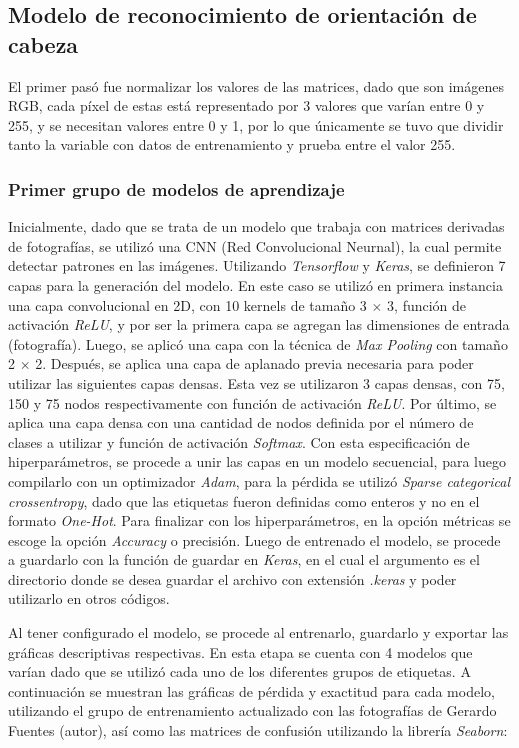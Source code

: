 \subsection{Modelo de reconocimiento de orientación de cabeza}
El primer pasó fue normalizar los valores de las matrices, dado que son imágenes RGB, cada píxel de estas está representado por 3 valores que varían entre 0 y 255, y se necesitan valores entre 0 y 1, por lo que únicamente se tuvo que dividir tanto la variable con datos de entrenamiento y prueba entre el valor 255. 

\subsubsection{Primer grupo de modelos de aprendizaje}
Inicialmente, dado que se trata de un modelo que trabaja con matrices derivadas de fotografías, se utilizó una CNN (Red Convolucional Neurnal), la cual permite detectar patrones en las imágenes. Utilizando \textit{Tensorflow} y \textit{Keras}, se definieron 7 capas para la generación del modelo. En este caso se utilizó en primera instancia una capa convolucional en 2D, con 10 kernels de tamaño 3 $\times$ 3, función de activación \textit{ReLU}, y por ser la primera capa se agregan las dimensiones de entrada (fotografía). Luego, se aplicó una capa con la técnica de \textit{Max Pooling} con tamaño 2 $\times$ 2. Después, se aplica una capa de aplanado previa necesaria para poder utilizar las siguientes capas densas. Esta vez se utilizaron 3 capas densas, con 75, 150 y 75 nodos respectivamente con función de activación \textit{ReLU}. Por último, se aplica una capa densa con una cantidad de nodos definida por el número de clases a utilizar y función de activación \textit{Softmax}. Con esta especificación de hiperparámetros, se procede a unir las capas en un modelo secuencial, para luego compilarlo con un optimizador \textit{Adam}, para la pérdida se utilizó \textit{Sparse categorical crossentropy}, dado que las etiquetas fueron definidas como enteros y no en el formato \textit{One-Hot}. Para finalizar con los hiperparámetros, en la opción métricas se escoge la opción \textit{Accuracy} o precisión. Luego de entrenado el modelo, se procede a guardarlo con la función de guardar en \textit{Keras}, en el cual el argumento es el directorio donde se desea guardar el archivo con extensión \textit{.keras} y poder utilizarlo en otros códigos.

Al tener configurado el modelo, se procede al entrenarlo, guardarlo y exportar las gráficas descriptivas respectivas. En esta etapa se cuenta con 4 modelos que varían dado que se utilizó cada uno de los diferentes grupos de etiquetas. A continuación se muestran las gráficas de pérdida y exactitud para cada modelo, utilizando el grupo de entrenamiento actualizado con las fotografías de Gerardo Fuentes (autor), así como las matrices de confusión utilizando la librería \textit{Seaborn}:

